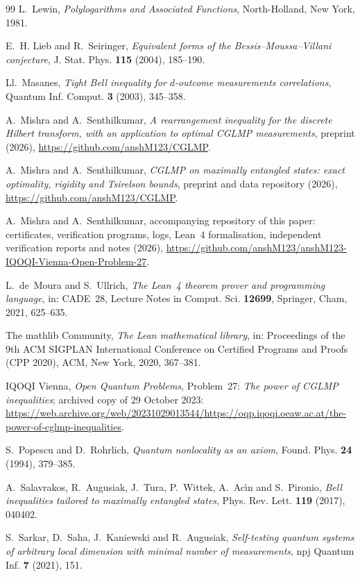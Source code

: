 \documentclass[11pt]{amsart}
\theoremstyle{definition}
\theoremstyle{remark}
\numberwithin{equation}{section}
\begin{document}
\begin{thebibliography}{99}
L.~Lewin, \emph{Polylogarithms and Associated Functions}, North-Holland, New York, 1981.

E.~H. Lieb and R.~Seiringer, \emph{Equivalent forms of the Bessis--Moussa--Villani conjecture}, J. Stat. Phys.
\textbf{115} (2004), 185--190.

Ll.~Masanes, \emph{Tight Bell inequality for $d$-outcome measurements correlations}, Quantum Inf. Comput. \textbf{3}
(2003), 345--358.

A.~Mishra and A.~Senthilkumar, \emph{A rearrangement inequality for the discrete Hilbert transform, with an application to
optimal CGLMP measurements}, preprint (2026), \url{https://github.com/anshM123/CGLMP}.

A.~Mishra and A.~Senthilkumar, \emph{CGLMP on maximally entangled states: exact optimality, rigidity and Tsirelson
bounds}, preprint and data repository (2026), \url{https://github.com/anshM123/CGLMP}.

A.~Mishra and A.~Senthilkumar, accompanying repository of this paper: certificates, verification programs, logs, Lean~4
formalisation, independent verification reports and notes (2026),
\url{https://github.com/anshM123/anshM123-IQOQI-Vienna-Open-Problem-27}.

L.~de~Moura and S.~Ullrich, \emph{The Lean~4 theorem prover and programming language}, in: CADE~28, Lecture Notes in
Comput. Sci. \textbf{12699}, Springer, Cham, 2021, 625--635.

The mathlib Community, \emph{The Lean mathematical library}, in: Proceedings of the 9th ACM SIGPLAN International
Conference on Certified Programs and Proofs (CPP 2020), ACM, New York, 2020, 367--381.

IQOQI Vienna, \emph{Open Quantum Problems}, Problem~27: \emph{The power of CGLMP inequalities}; archived copy of 29 October
2023:
\url{https://web.archive.org/web/20231029013544/https://oqp.iqoqi.oeaw.ac.at/the-power-of-cglmp-inequalities}.

S.~Popescu and D.~Rohrlich, \emph{Quantum nonlocality as an axiom}, Found. Phys. \textbf{24} (1994), 379--385.

A.~Salavrakos, R.~Augusiak, J.~Tura, P.~Wittek, A.~Ac\'{\i}n and S.~Pironio, \emph{Bell inequalities tailored to maximally
entangled states}, Phys. Rev. Lett. \textbf{119} (2017), 040402.

S.~Sarkar, D.~Saha, J.~Kaniewski and R.~Augusiak, \emph{Self-testing quantum systems of arbitrary local dimension with
minimal number of measurements}, npj Quantum Inf. \textbf{7} (2021), 151.


\end{thebibliography}
\end{document}
